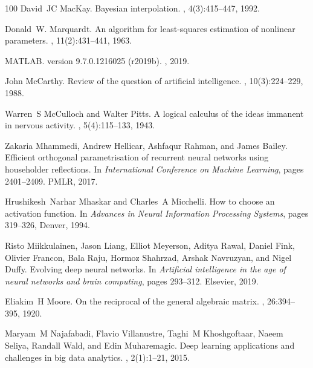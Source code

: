 \documentclass[a4paper,fleqn]{article}
\begin{document}
\begin{thebibliography}{100}
David~JC MacKay.
\newblock Bayesian interpolation.
, 4(3):415--447, 1992.

Donald~W. Marquardt.
\newblock An algorithm for least-squares estimation of nonlinear parameters.
,
  11(2):431--441, 1963.

MATLAB.
\newblock version 9.7.0.1216025 (r2019b).
, 2019.

John McCarthy.
\newblock Review of the question of artificial intelligence.
, 10(3):224--229, 1988.

Warren~S McCulloch and Walter Pitts.
\newblock A logical calculus of the ideas immanent in nervous activity.
, 5(4):115--133, 1943.

Zakaria Mhammedi, Andrew Hellicar, Ashfaqur Rahman, and James Bailey.
\newblock Efficient orthogonal parametrisation of recurrent neural networks
  using householder reflections.
\newblock In {\em International Conference on Machine Learning}, pages
  2401--2409. PMLR, 2017.

Hrushikesh~Narhar Mhaskar and Charles~A Micchelli.
\newblock How to choose an activation function.
\newblock In {\em Advances in Neural Information Processing Systems}, pages
  319--326, Denver, 1994.

Risto Miikkulainen, Jason Liang, Elliot Meyerson, Aditya Rawal, Daniel Fink,
  Olivier Francon, Bala Raju, Hormoz Shahrzad, Arshak Navruzyan, and Nigel
  Duffy.
\newblock Evolving deep neural networks.
\newblock In {\em Artificial intelligence in the age of neural networks and
  brain computing}, pages 293--312. Elsevier, 2019.

Eliakim~H Moore.
\newblock On the reciprocal of the general algebraic matrix.
, 26:394--395, 1920.

Maryam~M Najafabadi, Flavio Villanustre, Taghi~M Khoshgoftaar, Naeem Seliya,
  Randall Wald, and Edin Muharemagic.
\newblock Deep learning applications and challenges in big data analytics.
, 2(1):1--21, 2015.


\end{thebibliography}
\end{document}

